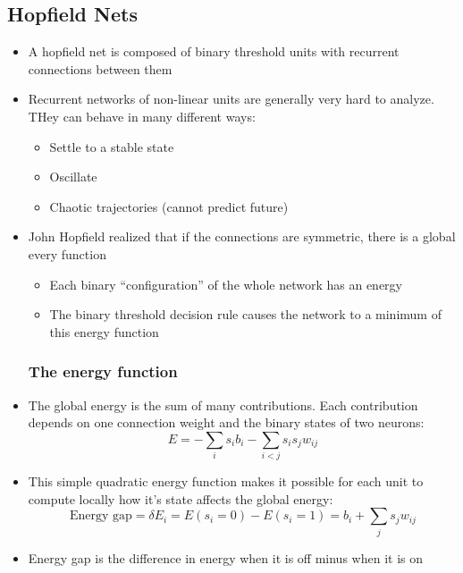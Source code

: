 \subsection{Hopfield Nets}
\begin{itemize}
	\item A hopfield net is composed of binary threshold units with recurrent connections between them
	\item Recurrent networks of non-linear units are generally very hard to analyze. THey can behave in many different ways:
	\begin{itemize}
		\item Settle to a stable state
		\item Oscillate
		\item Chaotic trajectories (cannot predict future)
	\end{itemize}

	\item John Hopfield realized that if the connections are symmetric, there is a global every function
	\begin{itemize}
		\item Each binary ``configuration'' of the whole network has an energy
		\item The binary threshold decision rule causes the network to a minimum of this energy function
	\end{itemize}

	\subsubsection{The energy function}
	\item The global energy is the sum of many contributions. Each contribution depends on one connection weight and the binary states of two neurons:
		$$E=-\sum_i s_i b_i - \sum_{i<j} s_i s_j w_{ij}$$
	\item This simple quadratic energy function makes it possible for each unit to compute locally how it's state affects the global energy:
		$$\text{Energy gap}=\delta E_i = E(s_i = 0) - E(s_i = 1) = b_i + \sum_j s_j w_{ij}$$
	\item Energy gap is the difference in energy when it is off minus when it is on
	

\end{itemize}
